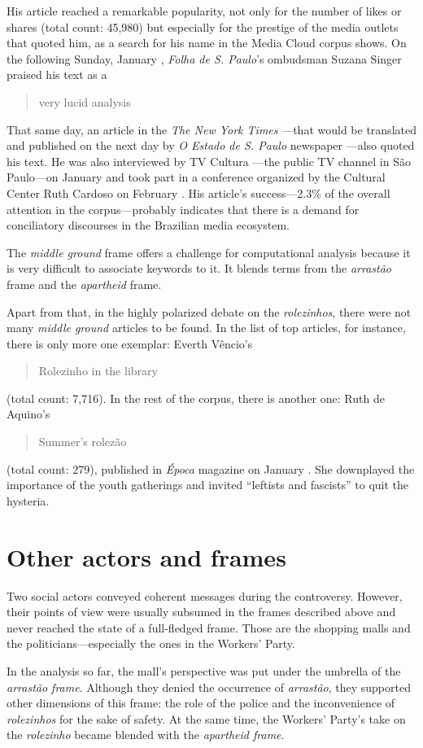 His article reached a remarkable popularity, not only for the number of likes or shares (total count: 45,980) but especially for the prestige of the media outlets that quoted him, as a search for his name in the Media Cloud corpus shows. On the following Sunday, January , \emph{Folha de S. Paulo}'s ombudsman Suzana Singer praised his text as a \blockcquote{folha_ombudsman}[.]{very lucid analysis} That same day, an article in the \emph{The New York Times} \autocite{nyt_rolezinhos}---that would be translated and published on the next day by \emph{O Estado de S. Paulo} newspaper \autocite{estadao_nyt}---also quoted his text. He was also interviewed by TV Cultura \autocite{youtube_beguoci}---the public TV channel in São Paulo---on January  and took part in a conference organized by the Cultural Center Ruth Cardoso on February  \autocite{youtube_ruthcardoso}. His article's success---2.3\% of the overall attention in the corpus---probably indicates that there is a demand for conciliatory discourses in the Brazilian media ecosystem.

The \emph{middle ground} frame offers a challenge for computational analysis because it is very difficult to associate keywords to it. It blends terms from the \emph{arrastão} frame and the \emph{apartheid} frame.

Apart from that, in the highly polarized debate on the \emph{rolezinhos}, there were not many \emph{middle ground} articles to be found. In the list of top articles, for instance, there is only more one exemplar: Everth Vêncio's \blockcquote{revista_bula}{Rolezinho in the library} (total count: 7,716). In the rest of the corpus, there is another one: Ruth de Aquino's \blockcquote{epoca_aquino}{Summer's rolezão} (total count: 279), published in \emph{Época} magazine on January . She downplayed the importance of the youth gatherings and invited \enquote{leftists and fascists} to quit the hysteria.

\section{Other actors and frames}

Two social actors conveyed coherent messages during the controversy. However, their points of view were usually subsumed in the frames described above and never reached the state of a full-fledged frame. Those are the shopping malls and the politicians---especially the ones in the Workers' Party.

In the analysis so far, the mall's perspective was put under the umbrella of the \emph{arrastão frame}. Although they denied the occurrence of \emph{arrastão}, they supported other dimensions of this frame: the role of the police and the inconvenience of \emph{rolezinhos} for the sake of safety. At the same time, the Workers' Party's take on the \emph{rolezinho} became blended with the \emph{apartheid frame}.

